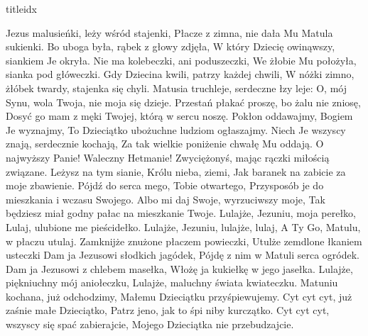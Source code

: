 \documentclass[a5paper, portrait, 12pt]{mwart}
\begin{document}
\begin{songs}{titleidx}


\beginverse
    Jezus malusieńki, leży wśród stajenki,
    Płacze z zimna, nie dała Mu Matula sukienki.
\endverse
\beginverse
    Bo uboga była, rąbek z głowy zdjęła,
    W który Dziecię owinąwszy, siankiem Je okryła.
\endverse
\beginverse
    Nie ma kolebeczki, ani poduszeczki,
    We żłobie Mu położyła, sianka pod główeczki.
\endverse
\beginverse
    Gdy Dziecina kwili, patrzy każdej chwili,
    W nóżki zimno, żłóbek twardy, stajenka się chyli.
\endverse
\beginverse
    Matusia truchleje, serdeczne łzy leje:
    O, mój Synu, wola Twoja, nie moja się dzieje.
\endverse
\beginverse
    Przestań płakać proszę, bo żalu nie zniosę,
    Dosyć go mam z męki Twojej, którą w sercu noszę.
\endverse
\beginverse
    Pokłon oddawajmy, Bogiem Je wyznajmy,
    To Dzieciątko ubożuchne ludziom ogłaszajmy.
\endverse
\beginverse
    Niech Je wszyscy znają, serdecznie kochają,
    Za tak wielkie poniżenie chwałę Mu oddają.
\endverse
\beginverse
    O najwyższy Panie! Waleczny Hetmanie!
    Zwyciężonyś, mając rączki miłością związane.
\endverse
\beginverse
    Leżysz na tym sianie, Królu nieba, ziemi,
    Jak baranek na zabicie za moje zbawienie.
\endverse
\beginverse
    Pójdź do serca mego, Tobie otwartego,
    Przysposób je do mieszkania i wczasu Swojego.
\endverse
\beginverse
    Albo mi daj Swoje, wyrzuciwszy moje,
    Tak będziesz miał godny pałac na mieszkanie Twoje. 
\endverse
\endsong
\beginverse
    Lulajże, Jezuniu, moja perełko,
    Lulaj, ulubione me pieścidełko.
\endverse
\beginchorus
        Lulajże, Jezuniu, lulajże, lulaj,
        A Ty Go, Matulu, w płaczu utulaj.
\endchorus
\beginverse
    Zamknijże znużone płaczem powieczki,
    Utulże zemdlone łkaniem usteczki
\endverse
\beginverse
    Dam ja Jezusowi słodkich jagódek,
    Pójdę z nim w Matuli serca ogródek.
\endverse
\beginverse
    Dam ja Jezusowi z chlebem masełka,
    Włożę ja kukiełkę w jego jasełka.
\endverse
\beginverse
    Lulajże, piękniuchny mój aniołeczku,
    Lulajże, maluchny świata kwiateczku.
\endverse
\beginverse
    Matuniu kochana, już odchodzimy,
    Małemu Dzieciątku przyśpiewujemy.
\endverse
\beginverse
    Cyt cyt cyt, już zaśnie małe Dzieciątko,
    Patrz jeno, jak to śpi niby kurczątko.
\endverse
\beginverse
    Cyt cyt cyt, wszyscy się spać zabierajcie,
    Mojego Dzieciątka nie przebudzajcie.
\endverse
\endsong

\end{songs}
\end{document}
